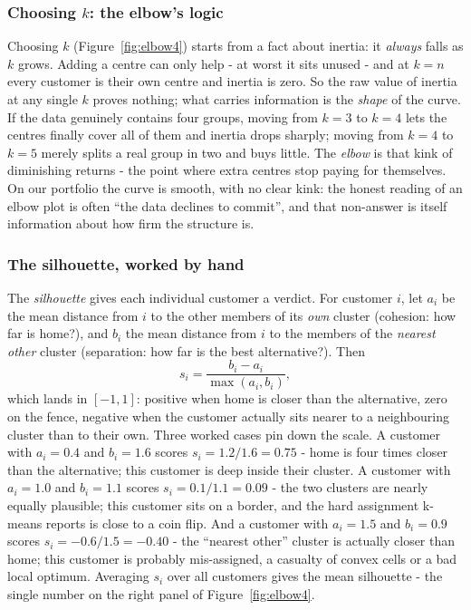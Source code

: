 \documentclass[11pt,a4paper]{article}
\begin{document}
\subsubsection{Choosing $k$: the elbow's logic}
Choosing $k$ (Figure~\ref{fig:elbow4}) starts from a fact about
inertia: it \emph{always} falls as $k$ grows. Adding a centre can only
help - at worst it sits unused - and at $k = n$ every customer is
their own centre and inertia is zero. So the raw value of inertia at
any single $k$ proves nothing; what carries information is the
\emph{shape} of the curve. If the data genuinely contains four groups,
moving from $k = 3$ to $k = 4$ lets the centres finally cover all of
them and inertia drops sharply; moving from $k = 4$ to $k = 5$ merely
splits a real group in two and buys little. The \emph{elbow} is that
kink of diminishing returns - the point where extra centres stop
paying for themselves. On our portfolio the curve is smooth, with no
clear kink: the honest reading of an elbow plot is often ``the data
declines to commit'', and that non-answer is itself information about
how firm the structure is.

\subsubsection{The silhouette, worked by hand}
The \emph{silhouette} gives each individual customer a verdict. For
customer $i$, let $a_i$ be the mean distance from $i$ to the other
members of its \emph{own} cluster (cohesion: how far is home?), and
$b_i$ the mean distance from $i$ to the members of the \emph{nearest
other} cluster (separation: how far is the best alternative?). Then
\[
  s_i = \frac{b_i - a_i}{\max(a_i, b_i)} ,
\]
which lands in $[-1, 1]$: positive when home is closer than the
alternative, zero on the fence, negative when the customer actually
sits nearer to a neighbouring cluster than to their own. Three worked
cases pin down the scale. A customer with $a_i = 0.4$ and $b_i = 1.6$
scores $s_i = 1.2/1.6 = 0.75$ - home is four times closer than the
alternative; this customer is deep inside their cluster. A customer
with $a_i = 1.0$ and $b_i = 1.1$ scores $s_i = 0.1/1.1 = 0.09$ - the
two clusters are nearly equally plausible; this customer sits on a
border, and the hard assignment k-means reports is close to a coin
flip. And a customer with $a_i = 1.5$ and $b_i = 0.9$ scores
$s_i = -0.6/1.5 = -0.40$ - the ``nearest other'' cluster is actually
closer than home; this customer is probably mis-assigned, a casualty of
convex cells or a bad local optimum. Averaging $s_i$ over all customers
gives the mean silhouette - the single number on the right panel of
Figure~\ref{fig:elbow4}.
\end{document}
